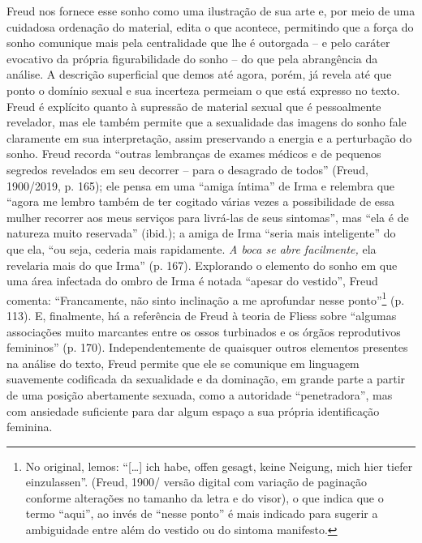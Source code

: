 Freud nos fornece esse sonho como uma ilustração de sua arte e, por meio
de uma cuidadosa ordenação do material, edita o que acontece, permitindo
que a força do sonho comunique mais pela centralidade que lhe é
outorgada -- e pelo caráter evocativo da própria figurabilidade do sonho
-- do que pela abrangência da análise. A descrição superficial que demos
até agora, porém, já revela até que ponto o domínio sexual e sua
incerteza permeiam o que está expresso no texto. Freud é explícito
quanto à supressão de material sexual que é pessoalmente revelador, mas
ele também permite que a sexualidade das imagens do sonho fale
claramente em sua interpretação, assim preservando a energia e a
perturbação do sonho. Freud recorda ``outras lembranças de exames
médicos e de pequenos segredos revelados em seu decorrer -- para o
desagrado de todos'' (Freud, 1900/2019, p. 165); ele pensa em uma
``amiga íntima'' de Irma e relembra que ``agora me lembro também de ter
cogitado várias vezes a possibilidade de essa mulher recorrer aos meus
serviços para livrá-las de seus sintomas'', mas ``ela é de natureza
muito reservada'' (ibid.); a amiga de Irma ``seria mais inteligente'' do
que ela, ``ou seja, cederia mais rapidamente. \emph{A boca se abre
facilmente,} ela revelaria mais do que Irma'' (p. 167). Explorando o
elemento do sonho em que uma área infectada do ombro de Irma é notada
``apesar do vestido'', Freud comenta: ``Francamente, não sinto
inclinação a me aprofundar nesse ponto''\footnote{No original, lemos:
  ``{[}\ldots{}{]} ich habe, offen gesagt, keine Neigung, mich hier
  tiefer einzulassen''. (Freud, 1900/ versão digital com variação de
  paginação conforme alterações no tamanho da letra e do visor), o que
  indica que o termo ``aqui'', ao invés de ``nesse ponto'' é mais
  indicado para sugerir a ambiguidade entre além do vestido ou do
  sintoma manifesto.} (p. 113). E, finalmente, há a referência de Freud
à teoria de Fliess sobre ``algumas associações muito marcantes entre os
ossos turbinados e os órgãos reprodutivos femininos'' (p. 170).
Independentemente de quaisquer outros elementos presentes na análise do
texto, Freud permite que ele se comunique em linguagem suavemente
codificada da sexualidade e da dominação, em grande parte a partir de
uma posição abertamente sexuada, como a autoridade ``penetradora'', mas
com ansiedade suficiente para dar algum espaço a sua própria
identificação feminina.

